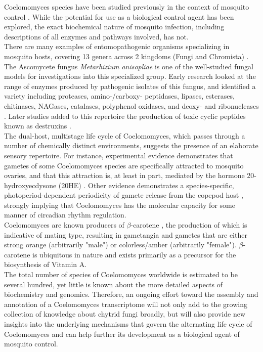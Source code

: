 \indent Coelomomyces species have been studied previously in the context of mosquito control \cite{Scholte2004}. While the potential for use as a biological control agent has been explored, the exact biochemical nature of mosquito infection, including descriptions of all enzymes and pathways involved, has not. \\
\indent There are many examples of entomopathogenic organisms specializing in mosquito hosts, covering 13 genera across 2 kingdoms (Fungi and Chromista) \cite{Scholte2004}. The Ascomycete fungus \textit{Metarhizium anisopliae} is one of the well-studied fungal models for investigations into this specialized group. Early research looked at the range of enzymes produced by pathogenic isolates of this fungus, and identified a variety including proteases, amino-/carboxy- peptidases, lipases, esterases, chitinases, NAGases, catalases, polyphenol oxidases, and deoxy- and ribonucleases \cite{(StLeger1986}. Later studies added to this repertoire the production of toxic cyclic peptides known as destruxins \cite{Wang2012}. \\ 
\indent The dual-host, multistage life cycle of Coelomomyces, which passes through a number of chemically distinct environments, suggests the presence of an elaborate sensory repertoire. For instance, experimental evidence demonstrates that gametes of some Coelomomyces species are specifically attracted to mosquito ovaries, and that this attraction is, at least in part, mediated by the hormone 20-hydroxyecdysone (20HE) \cite{Lucarotti1992}. Other evidence demonstrates a species-specific, photoperiod-dependent periodicity of gamete release from the copepod host \cite{Federici1983}, strongly implying that Coelomomyces has the molecular capacity for some manner of circadian rhythm regulation. \\
\indent Coelomomyces are known producers of $\beta$-carotene \cite{Federici1979}, the production of which is indicative of mating type, resulting in gametangia and gametes that are either strong orange (arbitrarily "male") or colorless/amber (arbitrarily "female"). $\beta$-carotene is ubiquitous in nature and exists primarily as a precursor for the biosynthesis of Vitamin A.\\
\indent The total number of species of Coelomomyces worldwide is estimated to be several hundred, yet little is known about the more detailed aspects of biochemistry and genomics. Therefore, an ongoing effort toward the assembly and annotation of a Coelomomyces transcriptome will not only add to the growing collection of knowledge about chytrid fungi broadly, but will also provide new insights into the underlying mechanisms that govern the alternating life cycle of Coelomomyces and can help further its development as a biological agent of mosquito control. \\

